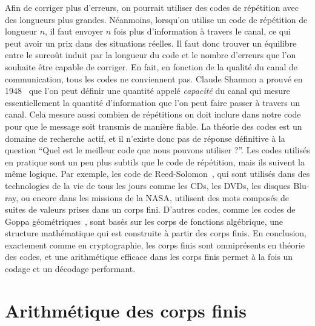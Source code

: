 Afin de corriger plus d'erreurs, on pourrait utiliser des codes de répétition
avec des longueurs plus grandes. Néanmoins, lorsqu'on utilise un code de
répétition de longueur $n$, il faut envoyer $n$ fois plus d'information à
travers le canal, ce qui peut avoir un prix dans des situations réelles. Il faut
donc trouver un équilibre entre le surcoût induit par la longueur du code et le
nombre d'erreurs que l'on souhaite être capable de corriger. En fait, en
fonction de la qualité du canal de communication, tous les codes ne conviennent
pas. Claude Shannon a prouvé en 1948~\cite{Shannon48} que l'on peut définir une
quantité appelé \emph{capacité} du canal qui mesure essentiellement la quantité
d'information que l'on peut faire passer à travers un canal. Cela mesure aussi
combien de répétitions on doit inclure dans notre code pour que le message soit
transmis de manière fiable. La théorie des codes est un domaine de recherche
actif, et il n'existe donc pas de réponse définitive à la question ``Quel est le
meilleur code que nous pouvons utiliser ?''. Les codes utilisés en pratique sont
un peu plus subtils que le code de répétition, mais ils suivent la même logique.
Par exemple, les code de Reed-Solomon~\cite{RS60}, qui sont utilisés dans des
technologies de la vie de tous les jours comme les CDs, les DVDs, les disques
Blu-ray, ou encore dans les missions de la NASA, utilisent des mots composés de 
suites de valeurs prises dans un corps fini. D'autres codes, comme les codes de
Goppa géométriques~\cite{Goppa81}, sont basés sur les corps de fonctions
algébrique, une structure mathématique qui est construite à partir des corps
finis. En conclusion, exactement comme en cryptographie, les corps finis sont
omniprésents en théorie des codes, et une arithmétique efficace dans les corps
finis permet à la fois un codage et un décodage performant.

\section*{Arithmétique des corps finis}

